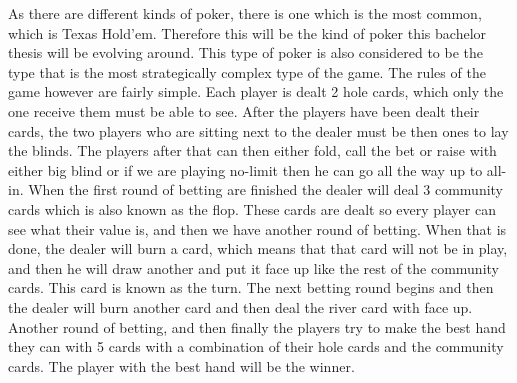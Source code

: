 As there are different kinds of poker, there is one which is the most common, which is Texas Hold’em. Therefore this will be the kind of poker this bachelor thesis will be evolving around. This type of poker is also considered to be the type that is the most strategically complex type of the game.
The rules of the game however are fairly simple.
Each player is dealt 2 hole cards, which only the one receive them must be able to see. 
After the players have been dealt their cards, the two players who are sitting next to the dealer must be then ones to lay the blinds.
The players after that can then either fold, call the bet or raise with either big blind or if we are playing no-limit then he can go all the way up to all-in. 
When the first round of betting are finished the dealer will deal 3 community cards which is also known as the flop. These cards are dealt so every player can see what their value is, and then we have another round of betting. When that is done, the dealer will burn a card, which means that that card will not be in play, and then he will draw another and put it face up like the rest of the community cards. This card is known as the turn. The next betting round begins and then the dealer will burn another card and then deal the river card with face up.
Another round of betting, and then finally the players try to make the best hand they can with 5 cards with a combination of their hole cards and the community cards. The player with the best hand will be the winner.
